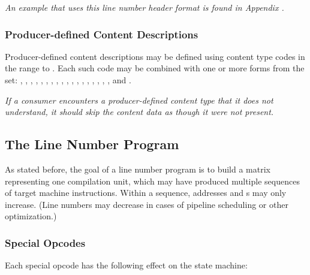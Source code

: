 \textit{An example that uses this line number header format
is found in Appendix .}

\bb
\subsubsection{Producer-defined Content Descriptions}
\label{chap:producerdefinedcontentdescriptions}
Producer-defined 
\eb
content descriptions may be defined using content
type codes in the range \DWLNCTlouserNAME{} to \DWLNCThiuserNAME{}. Each
such code may be combined with one or more forms from the set:
\DWFORMblock, \DWFORMblockone, \DWFORMblocktwo, \DWFORMblockfour,
\DWFORMdataone, \DWFORMdatatwo, \DWFORMdatafour, \DWFORMdataeight,
\DWFORMdatasixteen,
\DWFORMflag, \DWFORMlinestrp, \DWFORMsdata, \DWFORMsecoffset,
\DWFORMstring, \DWFORMstrp, 
\bb
\DWFORMstrpeight,
\DWFORMstrpsup, 
\DWFORMstrpsupeight,
\eb
\DWFORMstrxXN{} and \DWFORMudata.

\textit{If a consumer encounters a 
\bb
producer-defined content 
\eb
type that
it does not understand, it should skip the content data as though
it were not present.}

\subsection{The Line Number Program}
\label{chap:linenumberprogram}
As stated before, the goal of a line number program is to build
a matrix representing one compilation unit, which may have
produced multiple sequences of target machine instructions.
Within a sequence, addresses and 
s may only increase. 
(Line numbers may decrease in cases of pipeline
scheduling or other optimization.)

\subsubsection{Special Opcodes} 
\label{chap:specialopcodes}
Each \HFTubyte{} special opcode has the following 
effect on the state machine:

